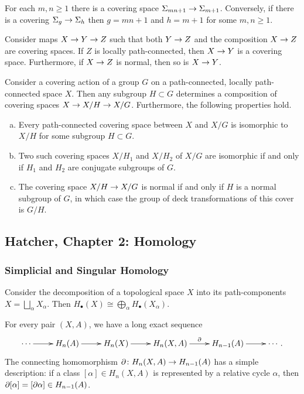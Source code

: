For each $m, n \geq 1$ there is a covering space $\Sigma_{m n + 1} \rightarrow \Sigma_{m+1}$. Conversely, if there is a covering $\Sigma_g \rightarrow \Sigma_h$ then $g = m n + 1$ and $h = m + 1$ for some $m, n \geq 1$.

\begin{proposition}
  Consider maps $X \rightarrow Y \rightarrow Z$ such that both $Y \rightarrow Z$ and the composition $X \rightarrow Z$ are covering spaces. If $Z$ is locally path-connected, then $X \rightarrow Y$ is a covering space. Furthermore, if $X \rightarrow Z$ is normal, then so is $X \rightarrow Y$.
\end{proposition}

\begin{proposition}
  Consider a covering action of a group $G$ on a path-connected, locally path-connected space $X$. Then any subgroup $H \subset G$ determines a composition of covering spaces $X \rightarrow X/H \rightarrow X/G$. Furthermore, the following properties hold.
  \begin{enumerate}[(a)]
  \item Every path-connected covering space between $X$ and $X/G$ is isomorphic to $X/H$ for some subgroup $H \subset G$.
  \item Two such covering spaces $X/H_1$ and $X/H_2$ of $X/G$ are isomorphic if and only if $H_1$ and $H_2$ are conjugate subgroups of $G$.
    \item The covering space $X/H \rightarrow X/G$ is normal if and only if $H$ is a normal subgroup of $G$, in which case the group of deck transformations of this cover is $G/H$.
  \end{enumerate}
\end{proposition}

\subsection{Hatcher, Chapter 2: Homology}

\subsubsection{Simplicial and Singular Homology}

\begin{proposition}
  Consider the decomposition of a topological space $X$ into its path-components $X = \bigsqcup_\alpha X_\alpha$. Then $H_\bullet(X) \cong \bigoplus_\alpha H_\bullet(X_\alpha)$.
\end{proposition}

\begin{theorem}
  For every pair $(X,A)$, we have a long exact sequence
  \[\xymatrix{
    \cdots \ar[r] & H_n(A) \ar[r] & H_n(X) \ar[r] & H_n(X,A) \ar[r]^-\d & H_{n-1}(A) \ar[r] & \cdots.
  }\]
  The connecting homomorphism $\partial \colon H_n(X,A) \rightarrow H_{n-1}(A)$ has a simple description: if a class $[\alpha] \in H_n(X,A)$ is represented by a relative cycle $\alpha$, then $\partial[\alpha] = [\partial \alpha] \in H_{n-1}(A)$.
\end{theorem}

